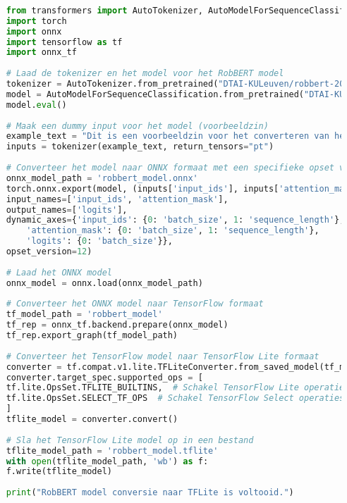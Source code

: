 \begin{lstlisting}[language=Python, caption={Volledige conversie code Pytorch naar TensforFlow Lite.}]
    
    from transformers import AutoTokenizer, AutoModelForSequenceClassification
    import torch
    import onnx
    import tensorflow as tf
    import onnx_tf
    
    # Laad de tokenizer en het model voor het RobBERT model
    tokenizer = AutoTokenizer.from_pretrained("DTAI-KULeuven/robbert-2023-dutch-large")
    model = AutoModelForSequenceClassification.from_pretrained("DTAI-KULeuven/robbert-2023-dutch-large")
    model.eval()
    
    # Maak een dummy input voor het model (voorbeeldzin)
    example_text = "Dit is een voorbeeldzin voor het converteren van het model."
    inputs = tokenizer(example_text, return_tensors="pt")
    
    # Converteer het model naar ONNX formaat met een specifieke opset versie (bijv. 12)
    onnx_model_path = 'robbert_model.onnx'
    torch.onnx.export(model, (inputs['input_ids'], inputs['attention_mask']), onnx_model_path,
    input_names=['input_ids', 'attention_mask'],
    output_names=['logits'],
    dynamic_axes={'input_ids': {0: 'batch_size', 1: 'sequence_length'},
        'attention_mask': {0: 'batch_size', 1: 'sequence_length'},
        'logits': {0: 'batch_size'}},
    opset_version=12)
    
    # Laad het ONNX model
    onnx_model = onnx.load(onnx_model_path)
    
    # Converteer het ONNX model naar TensorFlow formaat
    tf_model_path = 'robbert_model'
    tf_rep = onnx_tf.backend.prepare(onnx_model)
    tf_rep.export_graph(tf_model_path)
    
    # Converteer het TensorFlow model naar TensorFlow Lite formaat
    converter = tf.compat.v1.lite.TFLiteConverter.from_saved_model(tf_model_path)
    converter.target_spec.supported_ops = [
    tf.lite.OpsSet.TFLITE_BUILTINS,  # Schakel TensorFlow Lite operaties in
    tf.lite.OpsSet.SELECT_TF_OPS  # Schakel TensorFlow Select operaties in
    ]
    tflite_model = converter.convert()
    
    # Sla het TensorFlow Lite model op in een bestand
    tflite_model_path = 'robbert_model.tflite'
    with open(tflite_model_path, 'wb') as f:
    f.write(tflite_model)
    
    print("RobBERT model conversie naar TFLite is voltooid.")
    
\end{lstlisting}

